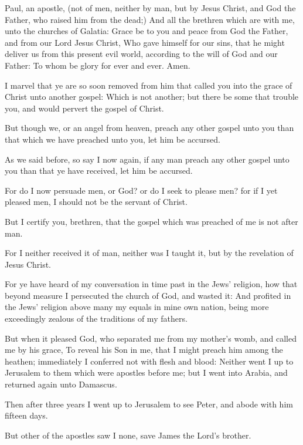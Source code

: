 \Chapter
\Verse Paul, an apostle, (not of men, neither by man, but by Jesus Christ, and God the Father, who raised him from the dead;) \Verse And all the brethren which are with me, unto the churches of Galatia: \Verse Grace be to you and peace from God the Father, and from our Lord Jesus Christ, \Verse Who gave himself for our sins, that he might deliver us from this present evil world, according to the will of God and our Father: \Verse To whom be glory for ever and ever. Amen.

\Verse I marvel that ye are so soon removed from him that called you into the grace of Christ unto another gospel: \Verse Which is not another; but there be some that trouble you, and would pervert the gospel of Christ.

\Verse But though we, or an angel from heaven, preach any other gospel unto you than that which we have preached unto you, let him be accursed.

\Verse As we said before, so say I now again, if any man preach any other gospel unto you than that ye have received, let him be accursed.

\Verse For do I now persuade men, or God? or do I seek to please men?  for if I yet pleased men, I should not be the servant of Christ.

\Verse But I certify you, brethren, that the gospel which was preached of me is not after man.

\Verse For I neither received it of man, neither was I taught it, but by the revelation of Jesus Christ.

\Verse For ye have heard of my conversation in time past in the Jews' religion, how that beyond measure I persecuted the church of God, and wasted it: \Verse And profited in the Jews' religion above many my equals in mine own nation, being more exceedingly zealous of the traditions of my fathers.

\Verse But when it pleased God, who separated me from my mother's womb, and called me by his grace, \Verse To reveal his Son in me, that I might preach him among the heathen; immediately I conferred not with flesh and blood: \Verse Neither went I up to Jerusalem to them which were apostles before me; but I went into Arabia, and returned again unto Damascus.

\Verse Then after three years I went up to Jerusalem to see Peter, and abode with him fifteen days.

\Verse But other of the apostles saw I none, save James the Lord's brother.

